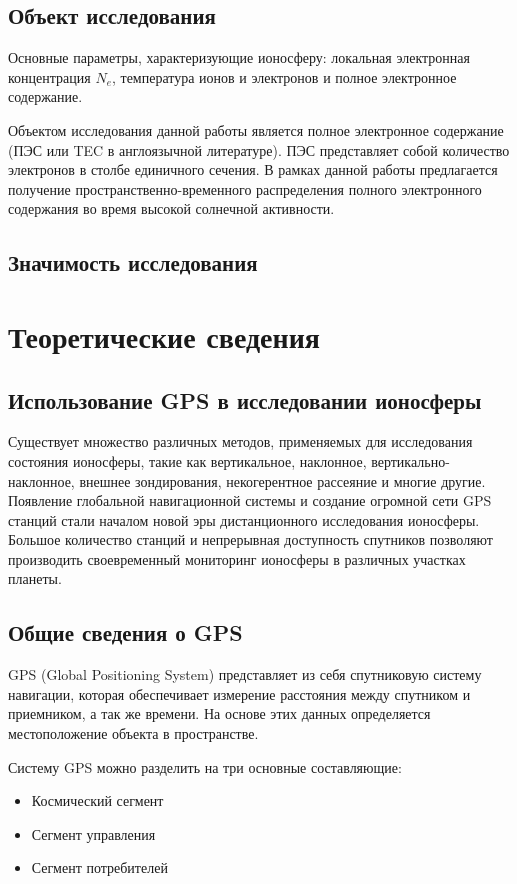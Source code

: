 \documentclass[a4paper]{article}
\begin{document}
\subsection*{Объект исследования}
Основные параметры, характеризующие ионосферу: локальная электронная концентрация $N_e$, температура ионов и электронов и полное электронное содержание.

Объектом исследования данной работы является полное электронное содержание (ПЭС или TEC в англоязычной литературе). ПЭС представляет собой количество электронов в столбе единичного сечения. В рамках данной работы предлагается получение пространственно-временного распределения полного электронного содержания во время высокой солнечной активности.

\subsection*{Значимость исследования}


\newpage
\section{Теоретические сведения}
\subsection{Использование GPS в исследовании ионосферы}
Существует множество различных методов, применяемых для исследования состояния ионосферы, такие как вертикальное, наклонное, вертикально-наклонное, внешнее зондирования, некогерентное рассеяние и многие другие. Появление глобальной навигационной системы и создание огромной сети GPS станций стали началом новой эры дистанционного исследования ионосферы. Большое количество станций и непрерывная доступность спутников позволяют производить своевременный мониторинг ионосферы в различных участках планеты. 

\newpage
\subsection{Общие сведения о GPS}
GPS (Global Positioning System) представляет из себя спутниковую систему навигации, которая обеспечивает измерение расстояния между спутником и приемником, а так же времени. На основе этих данных определяется местоположение объекта в пространстве.

Систему GPS можно разделить на три основные составляющие:
\begin{itemize}
\item Космический сегмент
\item Сегмент управления
\item Сегмент потребителей
\end{itemize}
\end{document}
